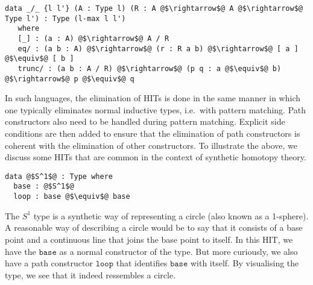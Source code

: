 \documentclass[12pt,twoside,maitrise]{dms}
\theoremstyle{definition}
\numberwithin{equation}{section}
\numberwithin{table}{chapter}
\numberwithin{figure}{chapter}
\newcommand\id[1] {\texttt{#1}}
\begin{document}
\begin{verbatim}
data _/_ {l l'} (A : Type l) (R : A @$\rightarrow$@ A @$\rightarrow$@ Type l') : Type (l-max l l')
   where
   [_] : (a : A) @$\rightarrow$@ A / R
   eq/ : (a b : A) @$\rightarrow$@ (r : R a b) @$\rightarrow$@ [ a ] @$\equiv$@ [ b ]
   trunc/ : (a b : A / R) @$\rightarrow$@ (p q : a @$\equiv$@ b) @$\rightarrow$@ p @$\equiv$@ q
\end{verbatim}

In such languages, the elimination of HITs is done in the same manner in which
one typically eliminates normal inductive types, i.e.\ with pattern matching.
Path constructors also need to be handled during pattern matching. Explicit side
conditions are then added to ensure that the elimination of path constructors is
coherent with the elimination of other constructors. To illustrate the above, we
discuss some HITs that are common in the context of synthetic homotopy theory.

\begin{verbatim}
data @$S^1$@ : Type where
  base : @$S^1$@
  loop : base @$\equiv$@ base
\end{verbatim}

The $S^1$ type is a synthetic way of representing a circle (also known as a
1-sphere). A reasonable way of describing a circle would be to say that it
consists of a base point and a continuous line that joins the base point to
itself. In this HIT, we have the $\id{base}$ as a normal constructor of the
type. But more curiously, we also have a path constructor $\id{loop}$ that
identifies $\id{base}$ with itself. By visualising the type, we see that it
indeed ressembles a circle.
\end{document}
